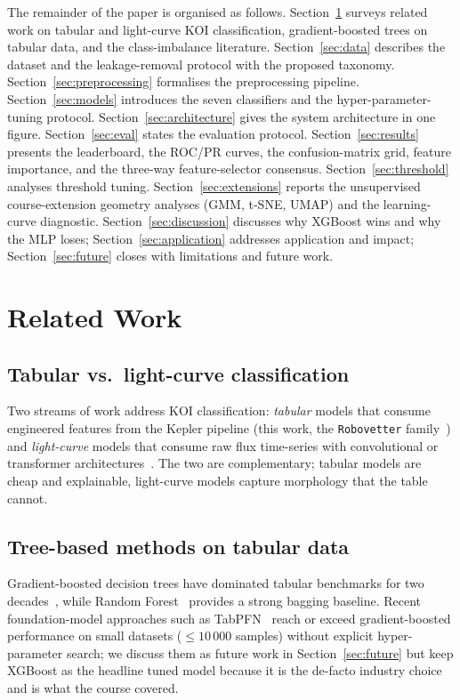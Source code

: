 \documentclass[conference]{IEEEtran}
\begin{document}
The remainder of the paper is organised as follows.
Section~\ref{sec:related} surveys related work on tabular and
light-curve KOI classification, gradient-boosted trees on tabular
data, and the class-imbalance literature. Section~\ref{sec:data}
describes the dataset and the leakage-removal protocol with the
proposed taxonomy. Section~\ref{sec:preprocessing} formalises the
preprocessing pipeline. Section~\ref{sec:models} introduces the
seven classifiers and the hyper-parameter-tuning protocol.
Section~\ref{sec:architecture} gives the system architecture in
one figure. Section~\ref{sec:eval} states the evaluation protocol.
Section~\ref{sec:results} presents the leaderboard, the ROC/PR
curves, the confusion-matrix grid, feature importance, and the
three-way feature-selector consensus.
Section~\ref{sec:threshold} analyses threshold tuning.
Section~\ref{sec:extensions} reports the unsupervised
course-extension geometry analyses (GMM, t-SNE, UMAP) and the
learning-curve diagnostic. Section~\ref{sec:discussion} discusses
why XGBoost wins and why the MLP loses;
Section~\ref{sec:application} addresses application and impact;
Section~\ref{sec:future} closes with limitations and future work.

\section{Related Work}\label{sec:related}

\subsection{Tabular vs.\ light-curve classification}
Two streams of work address KOI classification: \emph{tabular} models
that consume engineered features from the Kepler pipeline (this work,
the \texttt{Robovetter} family~\cite{thompson2018planetary}) and
\emph{light-curve} models that consume raw flux time-series with
convolutional or transformer
architectures~\cite{shallue2018identifying, malik2022exoplanet}. The
two are complementary; tabular models are cheap and explainable,
light-curve models capture morphology that the table cannot.

\subsection{Tree-based methods on tabular data}
Gradient-boosted decision trees have dominated tabular benchmarks for
two decades~\cite{chen2016xgboost,prokhorenkova2018catboost}, while
Random Forest~\cite{breiman2001random} provides a strong bagging
baseline. Recent foundation-model approaches such as
TabPFN~\cite{hollmann2025tabpfn} reach or exceed gradient-boosted
performance on small datasets ($\le 10\,000$ samples) without explicit
hyper-parameter search; we discuss them as future work in
Section~\ref{sec:future} but keep XGBoost as the headline tuned model
because it is the de-facto industry choice and is what the course
covered.
\end{document}
